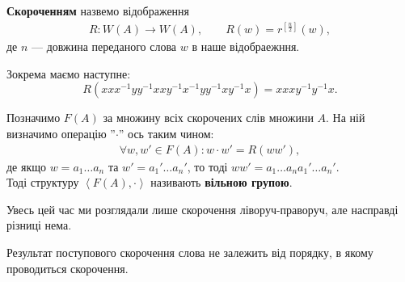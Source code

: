 \documentclass{math_library}
\begin{document}
\begin{definition}
\textbf{Скороченням} назвемо відображення
\begin{align*}
R \colon W(A) \to W(A), \qquad R(w) = r^{\left[\frac{n}{2}\right]}(w),
\end{align*}
де $n$ --- довжина переданого слова $w$ в наше відобраежння.
\end{definition}

\begin{example}
Зокрема маємо наступне:
\[ 
R(xxx^{-1}yy^{-1}xxy^{-1}x^{-1}yy^{-1}xy^{-1}x) = xxxy^{-1}y^{-1}x.
\]
\end{example}

\begin{definition}
Позначимо $F(A)$ за множину всіх скорочених слів множини $A$. На ній визначимо операцію ''$\cdot$'' ось таким чином:
\begin{align*}
\forall w,w' \in F(A): w \cdot w' = R(ww'),
\end{align*}
де якщо $w = a_1 \dots a_n$ та $w' = a_1' \dots a_n'$, то тоді $ww' = a_1 \dots a_n a_1' \dots a_n'$.\\
Тоді структуру $\left< F(A), \cdot \right>$ називають \textbf{вільною групою}.
\end{definition}

Увесь цей час ми розглядали лише скорочення ліворуч-праворуч, але насправді різниці нема.

\begin{lemma}
Результат поступового скорочення слова не залежить від порядку, в якому проводиться скорочення.
\end{lemma}
\end{document}
